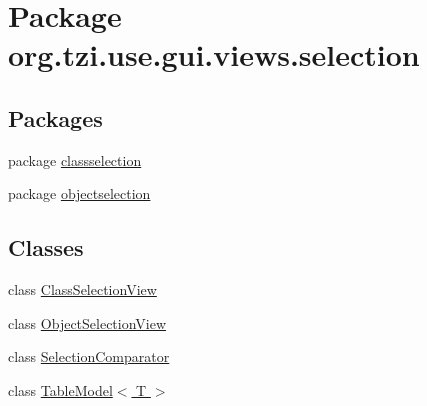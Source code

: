 \hypertarget{namespaceorg_1_1tzi_1_1use_1_1gui_1_1views_1_1selection}{\section{Package org.\-tzi.\-use.\-gui.\-views.\-selection}
\label{namespaceorg_1_1tzi_1_1use_1_1gui_1_1views_1_1selection}
}
\subsection*{Packages}
\begin{DoxyCompactItemize}
\item 
package \hyperlink{namespaceorg_1_1tzi_1_1use_1_1gui_1_1views_1_1selection_1_1classselection}{classselection}
\item 
package \hyperlink{namespaceorg_1_1tzi_1_1use_1_1gui_1_1views_1_1selection_1_1objectselection}{objectselection}
\end{DoxyCompactItemize}
\subsection*{Classes}
\begin{DoxyCompactItemize}
\item 
class \hyperlink{classorg_1_1tzi_1_1use_1_1gui_1_1views_1_1selection_1_1_class_selection_view}{Class\-Selection\-View}
\item 
class \hyperlink{classorg_1_1tzi_1_1use_1_1gui_1_1views_1_1selection_1_1_object_selection_view}{Object\-Selection\-View}
\item 
class \hyperlink{classorg_1_1tzi_1_1use_1_1gui_1_1views_1_1selection_1_1_selection_comparator}{Selection\-Comparator}
\item 
class \hyperlink{classorg_1_1tzi_1_1use_1_1gui_1_1views_1_1selection_1_1_table_model_3_01_t_01_4}{Table\-Model$<$ T $>$}
\end{DoxyCompactItemize}
